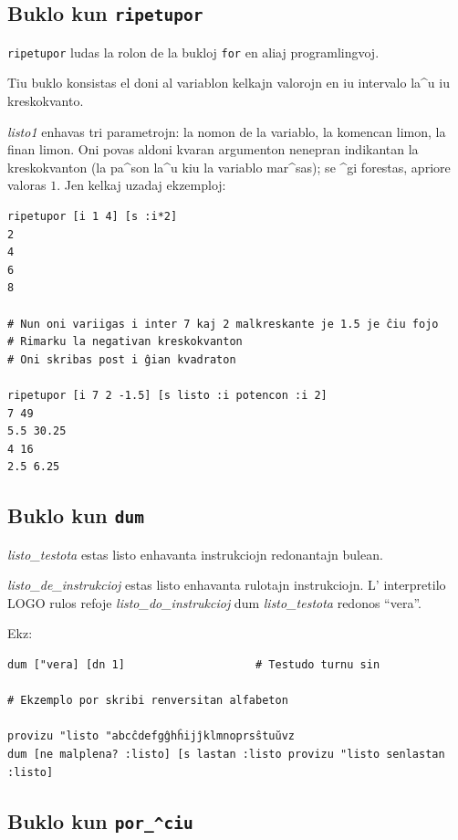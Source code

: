\subsection{Buklo kun \texttt{ripetupor}}

\texttt{ripetupor} ludas la rolon de la bukloj \texttt{for} en aliaj
programlingvoj.


Tiu buklo konsistas el doni al variablon kelkajn valorojn en iu
intervalo la^u iu kreskokvanto.

\textit{listo1} enhavas tri parametrojn: la nomon de la variablo, la
komencan limon, la finan limon. Oni povas aldoni kvaran argumenton
nenepran indikantan la kreskokvanton (la pa^son la^u kiu la variablo
mar^sas); se ^gi forestas, apriore valoras $1$.  Jen kelkaj uzadaj
ekzemploj:

\begin{verbatim}
ripetupor [i 1 4] [s :i*2]
2
4
6
8

# Nun oni variigas i inter 7 kaj 2 malkreskante je 1.5 je ĉiu fojo
# Rimarku la negativan kreskokvanton
# Oni skribas post i ĝian kvadraton

ripetupor [i 7 2 -1.5] [s listo :i potencon :i 2] 
7 49
5.5 30.25
4 16
2.5 6.25
\end{verbatim}

\subsection{Buklo kun \texttt{dum}}


\textit{listo\_testota} estas listo enhavanta instrukciojn redonantajn bulean.

\textit{listo\_de\_instrukcioj} estas listo enhavanta rulotajn
instrukciojn.  L' interpretilo LOGO rulos refoje
\textit{listo\_do\_instrukcioj} dum \textit{listo\_testota} redonos
``vera''.

Ekz:

\begin{verbatim}
dum ["vera] [dn 1]                    # Testudo turnu sin

# Ekzemplo por skribi renversitan alfabeton

provizu "listo "abcĉdefgĝhĥijĵklmnoprsŝtuŭvz
dum [ne malplena? :listo] [s lastan :listo provizu "listo senlastan :listo]
\end{verbatim}

\subsection{Buklo kun \texttt{por\_^ciu}}

